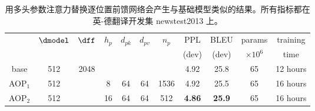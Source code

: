 \begin{table}[h]
\caption{用多头参数注意力替换逐位置前馈网络会产生与基础模型类似的结果。所有指标都在英-德翻译开发集 newstest2013 上。}
\label{tab:parameter_attention}
\begin{center}
\vspace{-2mm}
\begin{tabular}{c|cccccc|cccc}
\hline\rule{0pt}{2.0ex}
 & \multirow{2}{*}{$\dmodel$} & \multirow{2}{*}{$\dff$} &
\multirow{2}{*}{$h_p$} & \multirow{2}{*}{$d_{pk}$} & \multirow{2}{*}{$d_{pv}$} &
 \multirow{2}{*}{$n_p$} &
 PPL & BLEU & params & training\\
 & & & & & &  & (dev) & (dev) & $\times10^6$ & time \\
\hline\rule{0pt}{2.0ex}
base & 512 & 2048 & & & & & 4.92 & 25.8 & 65 & 12 hours\\
\hline\rule{0pt}{2.0ex}
AOP$_1$ & 512 & & 8 & 64 & 64 & 1536 & 4.92& 25.5  & 65 & 16 hours\\
AOP$_2$ & 512 & & 16 & 64 & 64 & 512 & \textbf{4.86} & \textbf{25.9}  & 65 & 16 hours \\
\hline
\end{tabular}
\end{center}
\end{table}
